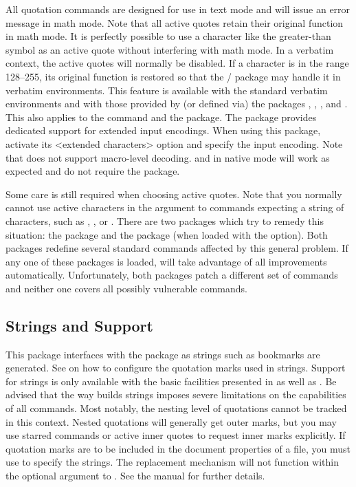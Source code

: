 \documentclass{ltxdockit}[2010/09/26]
\begin{document}
All quotation commands are designed for use in text mode and will issue an error message in math mode. Note that all active quotes retain their original function in math mode. It is perfectly possible to use a character like the greater-than symbol as an active quote without interfering with math mode. In a verbatim context, the active quotes will normally be disabled. If a character is in the range 128--255, its original function is restored so that the \slash {} package may handle it in verbatim environments. This feature is available with the standard verbatim environments and with those provided by (or defined via) the packages , , , and . This also applies to the  command and the  package. The  package provides dedicated support for extended input encodings. When using this package, activate its <extended characters> option and specify the input encoding. Note that  does not support macro-level \utf decoding. \xetex and \luatex in native \utf mode will work as expected and do not require the  package.

Some care is still required when choosing active quotes. Note that you normally cannot use active characters in the argument to commands expecting a string of characters, such as , , or . There are two packages which try to remedy this situation: the  package and the  package (when loaded with the  option). Both packages redefine several standard commands affected by this general problem. If any one of these packages is loaded,  will take advantage of all improvements automatically. Unfortunately, both packages patch a different set of commands and neither one covers all possibly vulnerable commands.

\subsection{\pdf Strings and  Support}
\label{hnt:pdf}

This package interfaces with the  package as \pdf strings such as bookmarks are generated. See  on how to configure the quotation marks used in \pdf strings. Support for \pdf strings is only available with the basic facilities presented in  as well as . Be advised that the way  builds \pdf strings imposes severe limitations on the capabilities of all commands. Most notably, the nesting level of quotations cannot be tracked in this context. Nested quotations will generally get outer marks, but you may use starred commands or active inner quotes to request inner marks explicitly. If quotation marks are to be included in the document properties of a \pdf file, you must use  to specify the strings. The replacement mechanism will not function within the optional argument to . See the  manual for further details.
\end{document}
